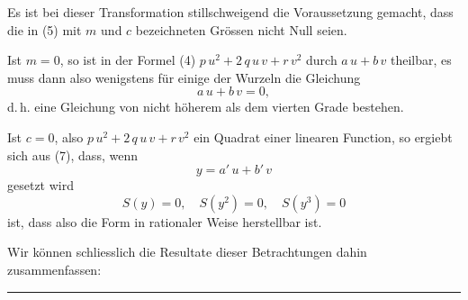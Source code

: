 
Es ist bei dieser Transformation stillschweigend die Voraussetzung gemacht, dass die in (5) mit $m$ und $c$ bezeichneten Gr\"ossen nicht Null seien.

Ist $m = 0$, so ist in der Formel (4) $p\,u^2 + 2\,q\,u\,v + r\,v^2$ durch $a\,u + b\,v$ theilbar, es muss dann also wenigstens f\"ur einige der Wurzeln die Gleichung
\[
a\,u + b\,v = 0,
\]
d.\,h. eine Gleichung von nicht h\"oherem als dem vierten Grade bestehen.

Ist $c = 0$, also $p\,u^2 + 2\,q\,u\,v + r\,v^2$ ein Quadrat einer linearen Function, so ergiebt sich aus (7), dass, wenn
\[
y = a'\,u + b'\,v
\]
gesetzt wird
\[
S(y) = 0, \quad S(y^2) = 0, \quad S(y^3) = 0
\]
ist, dass also die  Form in rationaler Weise herstellbar ist.

Wir k\"onnen schliesslich die Resultate dieser Betrachtungen dahin zusammenfassen:


\begin{center}
\rule{0.25\linewidth}{0.4pt}
\end{center}
